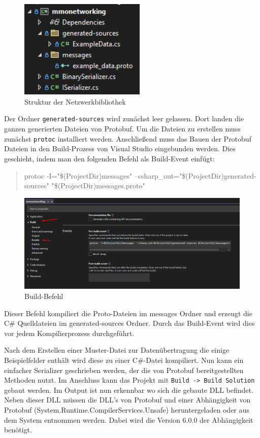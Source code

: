 \begin{figure}[!h]
	\centering
	\includegraphics[width=6cm]{figures/networkingstructure.png}
	\caption{Struktur der Netzwerkbibliothek}
	\label{fig:networkingstructure}
\end{figure}

Der Ordner \verb|generated-sources| wird zunächst leer gelassen. Dort landen die ganzen generierten Dateien von Protobuf. Um die Dateien zu erstellen muss zunächst \verb|protoc| installiert werden. Anschließend muss das Bauen der Protobuf Dateien in den Build-Prozess von Visual Studio eingebunden werden. Dies geschieht, indem man den folgenden Befehl als Build-Event einfügt:

\begin{quote}
	\centering
	protoc -I="\$(ProjectDir)messages" --csharp\_out="\$(ProjectDir)generated-sources" "\$(ProjectDir)messages\*.proto"
\end{quote}

\begin{figure}[!h]
	\centering
	\includegraphics[width=16cm]{figures/networkingprotobuild.png}
	\caption{Build-Befehl}
	\label{fig:networkingbuildcommand}
\end{figure}

Dieser Befehl kompiliert die Proto-Dateien im messages Ordner und erzeugt die C\# Quelldateien im generated-sources Ordner. Durch das Build-Event wird dies vor jedem Kompilierprozess durchgeführt.

Nach dem Erstellen einer Muster-Datei zur Datenübertragung die einige Beispielfelder enthält wird diese zu einer C\#-Datei kompiliert. Nun kann ein einfacher Serializer geschrieben werden, der die von Protobuf bereitgestellten Methoden nutzt. Im Anschluss kann das Projekt mit \verb|Build -> Build Solution| gebaut werden. Im Output ist nun erkennbar wo sich die gebaute DLL befindet. Neben dieser DLL müssen die DLL's von Protobuf und einer Abhängigkeit von Protobuf (System.Runtime.CompilerServices.Unsafe) heruntergeladen oder aus dem System entnommen werden. Dabei wird die Version 6.0.0 der Abhängigkeit benötigt.

